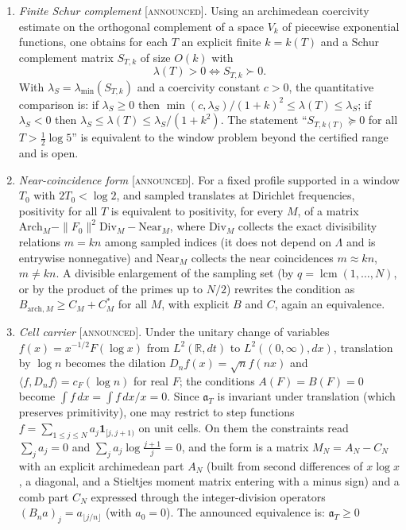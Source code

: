 \documentclass[11pt]{amsart}
\theoremstyle{definition}
\theoremstyle{remark}
\numberwithin{equation}{section}
\newcommand{\R}{\mathbb{R}}
\newcommand{\cF}{c_F}                                  %
\newcommand{\aT}{\mathfrak{a}_T}                       %
\newcommand{\lam}{\lambda(T)}                          %
\newcommand{\stag}[1]{\textsc{[#1]}}
\newcommand{\ANNOUNCED}{\stag{announced}}
\begin{document}
\begin{enumerate}
\item[(E1)] \emph{Finite Schur complement} \ANNOUNCED. Using an archimedean coercivity estimate on the orthogonal complement
of a space $V_k$ of piecewise exponential functions, one obtains for each $T$ an explicit finite $k=k(T)$ and a Schur
complement matrix $S_{T,k}$ of size $O(k)$ with
\[
\lam>0\iff S_{T,k}\succ0 .
\]
With $\lambda_S=\lambda_{\min}(S_{T,k})$ and a coercivity constant $c>0$, the quantitative comparison is: if
$\lambda_S\ge0$ then $\min(c,\lambda_S)/(1+k)^2\le\lam\le\lambda_S$; if $\lambda_S<0$ then
$\lambda_S\le\lam\le\lambda_S/(1+k^2)$. The statement ``$S_{T,k(T)}\succeq0$ for all
$T>\frac12\log5$'' is equivalent to the window problem beyond the certified range and is open.
\item[(E2)] \emph{Near-coincidence form} \ANNOUNCED. For a fixed profile supported in a window $T_0$ with $2T_0<\log2$, and
sampled translates at Dirichlet frequencies, positivity for all $T$ is equivalent to positivity, for every $M$, of a
matrix $\mathrm{Arch}_M-\|F_0\|^2\mathrm{Div}_M-\mathrm{Near}_M$, where $\mathrm{Div}_M$ collects the exact divisibility
relations $m=kn$ among sampled indices (it does not depend on $\Lambda$ and is entrywise nonnegative) and
$\mathrm{Near}_M$ collects the near coincidences $m\approx kn$, $m\ne kn$. A divisible enlargement of the sampling set (by
$q=\operatorname{lcm}(1,\dots,N)$, or by the product of the primes up to $N/2$) rewrites the condition as
$B_{\mathrm{arch},M}\ge C_M+C_M^*$ for all $M$, with explicit $B$ and $C$, again an equivalence.
\item[(E3)] \emph{Cell carrier} \ANNOUNCED. Under the unitary change of variables $f(x)=x^{-1/2}F(\log x)$ from
$L^2(\R,dt)$ to $L^2((0,\infty),dx)$, translation by $\log n$ becomes the dilation $D_nf(x)=\sqrt nf(nx)$ and
$\langle f,D_nf\rangle=\cF(\log n)$ for real $F$; the conditions $A(F)=B(F)=0$ become $\int f\,dx=\int f\,dx/x=0$.
Since $\aT$ is invariant under translation (which preserves primitivity), one may restrict to step functions
$f=\sum_{1\le j\le N}a_j\mathbf 1_{[j,j+1)}$ on unit cells. On them the constraints read $\sum_j a_j=0$ and
$\sum_j a_j\log\frac{j+1}{j}=0$, and the form is a matrix $M_N=A_N-C_N$ with an explicit archimedean part $A_N$ (built from second
differences of $x\log x$, a diagonal, and a Stieltjes moment matrix entering with a minus sign) and a comb part $C_N$
expressed through the integer-division operators $(B_na)_j=a_{\lfloor j/n\rfloor}$ (with $a_0=0$). The announced equivalence is: $\aT\ge0$

\end{enumerate}
\end{document}
